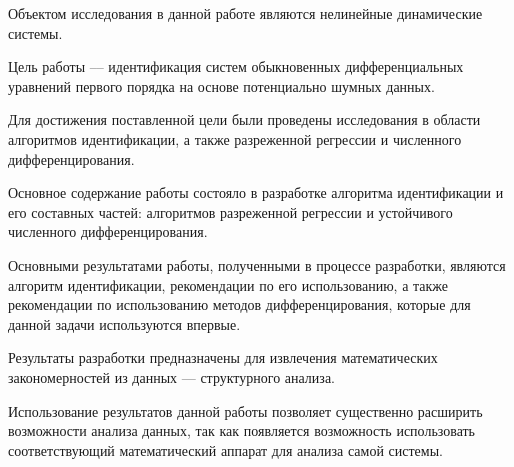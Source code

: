 \abstract


Объектом исследования в данной работе являются нелинейные динамические системы.

Цель работы –-- идентификация систем обыкновенных дифференциальных уравнений первого порядка на основе потенциально шумных данных.

Для достижения поставленной цели были проведены исследования в области алгоритмов идентификации, а также разреженной регрессии и численного дифференцирования.

Основное содержание работы состояло в разработке алгоритма идентификации и его составных частей: алгоритмов разреженной регрессии и устойчивого численного дифференцирования.

Основными результатами работы, полученными в процессе разработки, являются алгоритм идентификации, рекомендации по его использованию, а также рекомендации по использованию методов дифференцирования, которые для данной задачи используются впервые.

Результаты разработки предназначены для извлечения математических закономерностей из данных --- структурного анализа.

Использование результатов данной работы позволяет существенно расширить возможности анализа данных, так как появляется возможность использовать соответствующий математический аппарат для анализа самой системы.